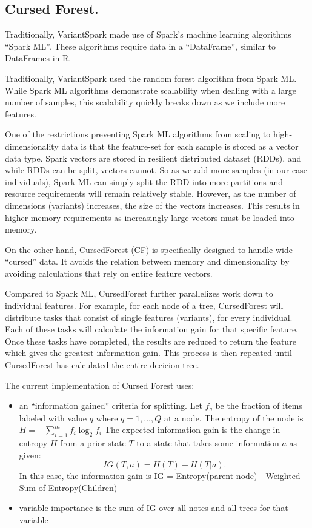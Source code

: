\documentclass[10pt,a4paper]{article}  %
\begin{document}
\subsection{Cursed Forest.}
Traditionally, VariantSpark made use of Spark's machine learning algorithms ``Spark ML''. These algorithms require data
in a ``DataFrame'', similar to DataFrames in R.

Traditionally, VariantSpark used the random forest algorithm from Spark ML. While Spark ML algorithms demonstrate
scalability when dealing with a large number of samples, this scalability quickly breaks down as we include more
features.

One of the restrictions preventing Spark ML algorithms from scaling to high-dimensionality data is that the feature-set
for each sample is stored as a vector data type. Spark vectors are stored in resilient distributed dataset (RDDs), and
while RDDs can be split, vectors cannot. So as we add more samples (in our case individuals), Spark ML can simply split
the RDD into more partitions and resource requirements will remain relatively stable. However, as the number of
dimensions (variants) increases, the size of the vectors increases. This results in higher memory-requirements as
increasingly large vectors must be loaded into memory.

On the other hand, CursedForest (CF) is specifically designed to handle wide ``cursed'' data. It avoids the relation
between memory and dimensionality by avoiding calculations that rely on entire feature vectors.

Compared to Spark ML, CursedForest further parallelizes work down to individual features.  For example, for each node of
a tree, CursedForest will distribute tasks that consist of single features (variants), for every individual.  Each of
these tasks will calculate the information gain for that specific feature.  Once these tasks have completed, the results
are reduced to return the feature which gives the greatest information gain.  This process is then repeated until
CursedForest has calculated the entire decicion tree.

The current implementation of Cursed Forest uses:
\begin{itemize}
\item an ``information gained'' criteria for splitting. Let $f_q$ be the fraction of items labeled with value $q$ where $q= 1,
  \ldots, Q$ at a node. The  entropy of the node is $H = - \sum^{m}_{i=1} f_i \log^{}_2 f_i$
The expected information gain is the change in entropy $H$ from a prior state $T$ to a state that takes some
information $a$ as given: 
\[ IG(T,a) = H(T) - H(T|a). \]
In this case, the information gain is IG = Entropy(parent node) - Weighted Sum of Entropy(Children)
\item variable importance is the sum of IG over all notes and all trees for that variable
\end{itemize}
\end{document}
